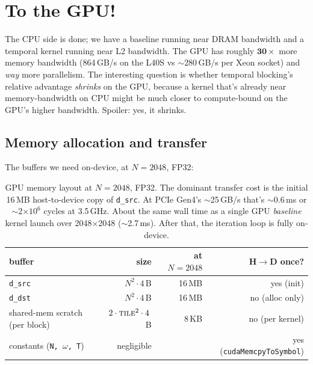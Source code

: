 \documentclass[11pt]{article}
\begin{document}
\section{To the GPU!}
\label{sec:gpu}

The CPU side is done; we have a baseline running near DRAM bandwidth
and a temporal kernel running near L2 bandwidth.  The GPU has roughly
$\mathbf{30\times}$ more memory bandwidth (864\,GB/s on the L40S vs
$\sim$280\,GB/s per Xeon socket) and \emph{way} more parallelism.
The interesting question is whether temporal blocking's relative
advantage \emph{shrinks} on the GPU, because a kernel that's already
near memory-bandwidth on CPU might be much closer to compute-bound on
the GPU's higher bandwidth.  Spoiler: yes, it shrinks.

\subsection{Memory allocation and transfer}

The buffers we need on-device, at $N{=}2048$, FP32:

\begin{table}[h!]
\centering
\renewcommand{\arraystretch}{1.1}
\begin{tabular}{lrrr}
\toprule
\textbf{buffer} & \textbf{size} & \textbf{at $N{=}2048$} & \textbf{H$\to$D once?} \\
\midrule
\texttt{d\_src}                 & $N^2 \cdot 4$\,B   & 16\,MB & yes (init) \\
\texttt{d\_dst}                 & $N^2 \cdot 4$\,B   & 16\,MB & no (alloc only) \\
shared-mem scratch (per block)  & $2\cdot\textsc{tile}^2 \cdot 4$\,B & 8\,KB & no (per kernel) \\
constants (\texttt{N, $\omega$, T}) & negligible    &        & yes (\texttt{cudaMemcpyToSymbol}) \\
\bottomrule
\end{tabular}
\caption{GPU memory layout at $N{=}2048$, FP32.  The dominant transfer
cost is the initial 16\,MB host-to-device copy of \texttt{d\_src}.
At PCIe Gen4's $\sim$25\,GB/s that's $\sim$0.6\,ms or $\sim$2$\times
10^6$ cycles at 3.5\,GHz. About the same wall time as a single
GPU \emph{baseline} kernel launch over 2048$\times$2048
($\sim$2.7\,ms).  After that, the iteration loop is fully on-device.}
\label{tab:gpu-mem}
\end{table}
\end{document}
